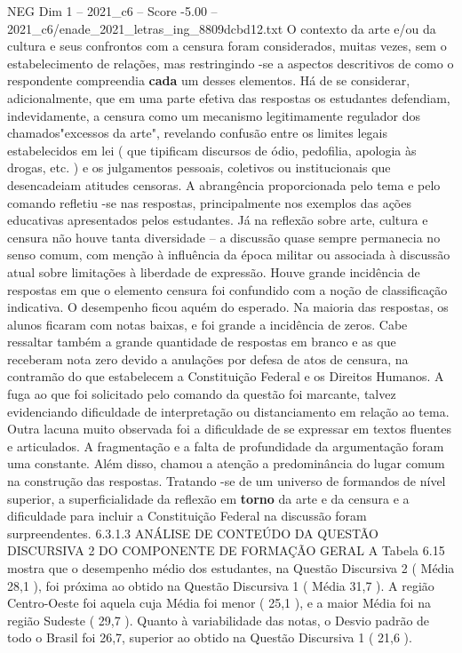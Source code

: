 \begin{textsample}{NEG Dim 1 – 2021\_c6 – Score -5.00 – 2021\_c6/enade\_2021\_letras\_ing\_8809dcbd12.txt}
O contexto da arte e/ou da cultura e seus confrontos com a censura foram considerados, muitas vezes, sem o estabelecimento de relações, mas restringindo -se a aspectos descritivos de como o respondente compreendia \textbf{cada} um desses elementos.
Há de se considerar, adicionalmente, que em uma parte efetiva das respostas os estudantes defendiam, indevidamente, a censura como um mecanismo legitimamente regulador dos chamados"excessos da arte", revelando confusão entre os limites legais estabelecidos em lei ( que tipificam discursos de ódio, pedofilia, apologia às drogas, etc. ) e os julgamentos pessoais, coletivos ou institucionais que desencadeiam atitudes censoras.
A abrangência proporcionada pelo tema e pelo comando refletiu -se nas respostas, principalmente nos exemplos das ações educativas apresentados pelos estudantes.
Já na reflexão sobre arte, cultura e censura não houve tanta diversidade – a discussão quase sempre permanecia no senso comum, com menção à influência da época militar ou associada à discussão atual sobre limitações à liberdade de expressão.
Houve grande incidência de respostas em que o elemento censura foi confundido com a noção de classificação indicativa.
O desempenho ficou aquém do esperado.
Na maioria das respostas, os alunos ficaram com notas baixas, e foi grande a incidência de zeros.
Cabe ressaltar também a grande quantidade de respostas em branco e as que receberam nota zero devido a anulações por defesa de atos de censura, na contramão do que estabelecem a Constituição Federal e os Direitos Humanos.
A fuga ao que foi solicitado pelo comando da questão foi marcante, talvez evidenciando dificuldade de interpretação ou distanciamento em relação ao tema.
Outra lacuna muito observada foi a dificuldade de se expressar em textos fluentes e articulados.
A fragmentação e a falta de profundidade da argumentação foram uma constante.
Além disso, chamou a atenção a predominância do lugar comum na construção das respostas.
Tratando -se de um universo de formandos de nível superior, a superficialidade da reflexão em \textbf{torno} da arte e da censura e a dificuldade para incluir a Constituição Federal na discussão foram surpreendentes. 6.3.1.3 ANÁLISE DE CONTEÚDO DA QUESTÃO DISCURSIVA 2 DO COMPONENTE DE FORMAÇÃO GERAL A Tabela 6.15 mostra que o desempenho médio dos estudantes, na Questão Discursiva 2 ( Média 28,1 ), foi próxima ao obtido na Questão Discursiva 1 ( Média 31,7 ).
A região Centro-Oeste foi aquela cuja Média foi menor ( 25,1 ), e a maior Média foi na região Sudeste ( 29,7 ).
Quanto à variabilidade das notas, o Desvio padrão de todo o Brasil foi 26,7, superior ao obtido na Questão Discursiva 1 ( 21,6 ).

\end{textsample}
